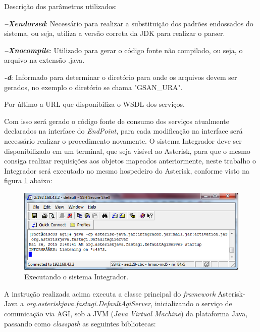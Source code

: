Descrição dos parâmetros utilizados:

\begin{description}
	\item \textbf{\textit{–Xendorsed}}: Necessário para realizar a substituição dos padrões endossados do sistema, ou seja, utiliza a versão correta da JDK para realizar o parser.
	\item \textbf{\textit{–Xnocompile}}: Utilizado para gerar o código fonte não compilado, ou seja, o arquivo na extensão .java.
	\item \textbf{\textit{-d}}: Informado para determinar o diretório para onde os arquivos devem ser gerados, no exemplo o diretório se chama "GSAN\_URA".
	\item Por último a URL que disponibiliza o WSDL dos serviços. 
\end{description}



Com isso será gerado o código fonte de consumo dos serviços atualmente declarados na interface do \textit{EndPoint}, para cada modificação na interface será necessário realizar o procedimento novamente. O sistema Integrador deve ser disponibilizado em um terminal, que seja visível ao Asterisk, para que o mesmo consiga realizar requisições aos objetos mapeados anteriormente, neste trabalho o Integrador será executado no mesmo hospedeiro do Asterisk, conforme visto na figura \ref{figura:executarIntegrador} abaixo:

\begin{figure}[!htb]
	\centering
	\caption{Executando o sistema Integrador.}	
	\label{figura:executarIntegrador}
	\includegraphics{figuras/executar_integrador.png}
\end{figure}


A instrução realizada acima executa a classe principal do \textit{framework} Asterisk-Java a \textit{ org.asteriskjava.fastagi.DefaultAgiServer}, inicializando o serviço de comunicação via AGI, sob a JVM (\textit{Java Virtual Machine}) da plataforma Java, passando como \textit{classpath} as seguintes bibliotecas: 

